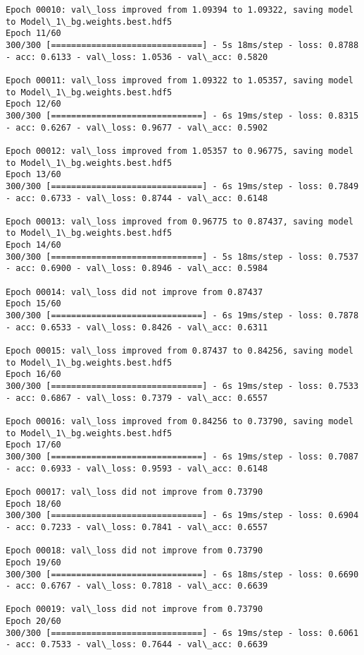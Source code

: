 \documentclass[11pt]{article}
\begin{document}
\begin{Verbatim}[commandchars=\\\{\}]
Epoch 00010: val\_loss improved from 1.09394 to 1.09322, saving model to Model\_1\_bg.weights.best.hdf5
Epoch 11/60
300/300 [==============================] - 5s 18ms/step - loss: 0.8788 - acc: 0.6133 - val\_loss: 1.0536 - val\_acc: 0.5820

Epoch 00011: val\_loss improved from 1.09322 to 1.05357, saving model to Model\_1\_bg.weights.best.hdf5
Epoch 12/60
300/300 [==============================] - 6s 19ms/step - loss: 0.8315 - acc: 0.6267 - val\_loss: 0.9677 - val\_acc: 0.5902

Epoch 00012: val\_loss improved from 1.05357 to 0.96775, saving model to Model\_1\_bg.weights.best.hdf5
Epoch 13/60
300/300 [==============================] - 6s 19ms/step - loss: 0.7849 - acc: 0.6733 - val\_loss: 0.8744 - val\_acc: 0.6148

Epoch 00013: val\_loss improved from 0.96775 to 0.87437, saving model to Model\_1\_bg.weights.best.hdf5
Epoch 14/60
300/300 [==============================] - 5s 18ms/step - loss: 0.7537 - acc: 0.6900 - val\_loss: 0.8946 - val\_acc: 0.5984

Epoch 00014: val\_loss did not improve from 0.87437
Epoch 15/60
300/300 [==============================] - 6s 19ms/step - loss: 0.7878 - acc: 0.6533 - val\_loss: 0.8426 - val\_acc: 0.6311

Epoch 00015: val\_loss improved from 0.87437 to 0.84256, saving model to Model\_1\_bg.weights.best.hdf5
Epoch 16/60
300/300 [==============================] - 6s 19ms/step - loss: 0.7533 - acc: 0.6867 - val\_loss: 0.7379 - val\_acc: 0.6557

Epoch 00016: val\_loss improved from 0.84256 to 0.73790, saving model to Model\_1\_bg.weights.best.hdf5
Epoch 17/60
300/300 [==============================] - 6s 19ms/step - loss: 0.7087 - acc: 0.6933 - val\_loss: 0.9593 - val\_acc: 0.6148

Epoch 00017: val\_loss did not improve from 0.73790
Epoch 18/60
300/300 [==============================] - 6s 19ms/step - loss: 0.6904 - acc: 0.7233 - val\_loss: 0.7841 - val\_acc: 0.6557

Epoch 00018: val\_loss did not improve from 0.73790
Epoch 19/60
300/300 [==============================] - 6s 18ms/step - loss: 0.6690 - acc: 0.6767 - val\_loss: 0.7818 - val\_acc: 0.6639

Epoch 00019: val\_loss did not improve from 0.73790
Epoch 20/60
300/300 [==============================] - 6s 19ms/step - loss: 0.6061 - acc: 0.7533 - val\_loss: 0.7644 - val\_acc: 0.6639


\end{Verbatim}
\end{document}
